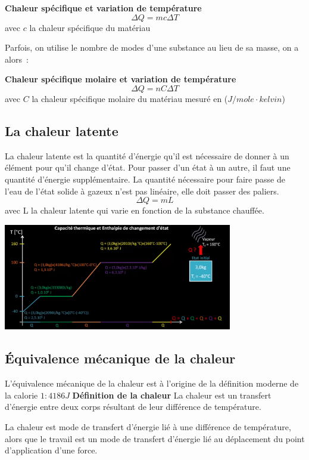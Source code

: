 \documentclass{article}
\begin{document}
\noindent
\textbf{Chaleur spécifique et variation de température}
\[\Delta Q = mc\Delta T\]
avec $c$ la chaleur spécifique du matériau
\newline

Parfois, on utilise le nombre de modes d'une substance au lieu de sa masse, on a alors :
\newline

\noindent
\textbf{Chaleur spécifique molaire et variation de température}
\[\Delta Q = nC\Delta T\]
avec $C$ la chaleur spécifique molaire du matériau mesuré en ($J/mole\cdot kelvin$)

\subsection{La chaleur latente}
La chaleur latente est la quantité d'énergie qu'il est nécessaire de donner à un élément pour qu'il change d'état. Pour passer d'un état à un autre, il faut une quantité d'énergie supplémentaire. La quantité nécessaire pour faire passe de l'eau de l'état solide à gazeux n'est pas linéaire, elle doit passer des paliers.
\[\Delta Q = mL\]
avec L la chaleur latente qui varie en fonction de la substance chauffée.

\begin{center}
    \includegraphics[width=10cm]{Image/ChaleurLatente.png}
\end{center}

\subsection{Équivalence mécanique de la chaleur}
L'équivalence mécanique de la chaleur est à l'origine de la définition moderne de la calorie $1: 4186J$
\newline
\textbf{Définition de la chaleur}
\newline
La chaleur est un transfert d'énergie entre deux corps résultant de leur différence de température.
\newline

La chaleur est mode de transfert d'énergie lié à  une différence de température, alors que le travail est un mode de transfert d'énergie lié au déplacement du point d'application d'une force.
\end{document}
